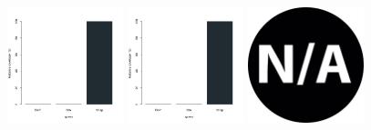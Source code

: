 \begin{figure}[H]
\centering
\includegraphics[width=0.3\textwidth]{img/solver_instance_coverage_b=3_l_1800s.png}
\includegraphics[width=0.3\textwidth]{img/solver_instance_coverage_b=3_l_2700s.png}
\includegraphics[width=0.3\textwidth]{img/na.png}
\caption*{\textsc{Zeitlimit} $30min$ $\quad\quad\quad$ \textsc{Zeitlimit} $45min$ $\quad\quad\quad$ \textsc{Zeitlimit} $60min$}
\begin{subfigure}[b]{0.3\textwidth}
\centering
{}
\end{subfigure}
\begin{subfigure}[b]{0.3\textwidth}

\end{subfigure}
\end{figure}
